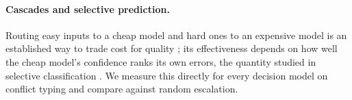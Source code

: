 \paragraph{Cascades and selective prediction.}
Routing easy inputs to a cheap model and hard ones to an expensive model is an established way to trade cost for
quality \citep{chen2023frugalgpt}; its effectiveness depends on how well the cheap model's confidence ranks its own
errors, the quantity studied in selective classification \citep{geifman2017selective}. We measure this directly
for every decision model on conflict typing and compare against random escalation.
